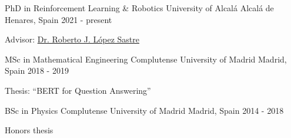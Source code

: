 

\begin{cventries}

  \cventry
    {PhD in Reinforcement Learning \& Robotics} %
    {University of Alcalá} %
    {Alcalá de Henares, Spain} %
    {2021 - present} %
    {
      \begin{cvitems} %
        \item {Advisor: \href{https://gram.web.uah.es/people/rober/}{Dr. Roberto J. López Sastre}}
      \end{cvitems}
    }

  \cventry
    {MSc in Mathematical Engineering} %
    {Complutense University of Madrid} %
    {Madrid, Spain} %
    {2018 - 2019} %
    {
      \begin{cvitems} %
        \item {Thesis: ``BERT for Question Answering''}
      \end{cvitems}
    }

  \cventry
    {BSc in Physics} %
    {Complutense University of Madrid} %
    {Madrid, Spain} %
    {2014 - 2018} %
    {
      \begin{cvitems} %
        \item {Honors thesis}
      \end{cvitems}
    }

\end{cventries}
